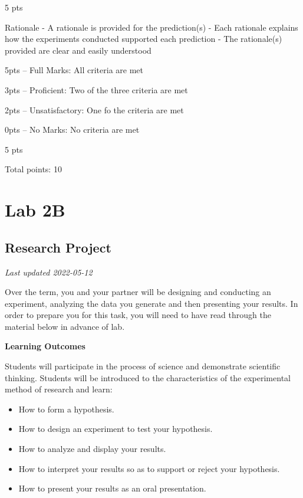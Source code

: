 \documentclass[
]{book}
\providecommand{\tightlist}{%
  \setlength{\itemsep}{0pt}\setlength{\parskip}{0pt}}
\begin{document}
5 pts

Rationale
- A rationale is provided for the prediction(s)
- Each rationale explains how the experiments conducted supported each prediction
- The rationale(s) provided are clear and easily understood

5pts -- Full Marks: All criteria are met

3pts -- Proficient: Two of the three criteria are met

2pts -- Unsatisfactory: One fo the criteria are met

0pts -- No Marks: No criteria are met

5 pts

Total points: 10

\hypertarget{part-lab-2b}{%
\part*{Lab 2B}\label{part-lab-2b}}

\hypertarget{research-project}{%
\chapter*{Research Project}\label{research-project}}

\emph{Last updated 2022-05-12}

Over the term, you and your partner will be designing and conducting an experiment, analyzing the data you generate and then presenting your results. In order to prepare you for this task, you will need to have read through the material below in advance of lab.

\textbf{Learning Outcomes}

Students will participate in the process of science and demonstrate scientific thinking. Students will be introduced to the characteristics of the experimental method of research and learn:

\begin{itemize}
\tightlist
\item
  How to form a hypothesis.
\item
  How to design an experiment to test your hypothesis.
\item
  How to analyze and display your results.
\item
  How to interpret your results so as to support or reject your hypothesis.
\item
  How to present your results as an oral presentation.
\end{itemize}
\end{document}

